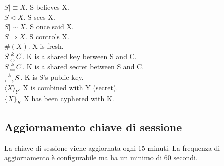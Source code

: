 \documentclass[a4paper,titlepage]{article}
\begin{document}
$ S \mid \equiv X  $. S believes X.\\
$ S \lhd X  $. S sees X.\\
$ S \mid \sim X  $. S once said X.\\
$ S \Rightarrow X $. S controls X.\\ 
$ \#(X) $. X is fresh.\\
$S {k \atop \leftrightarrow} C $. K is a shared key between S and C.\\ 
$S {k \atop \leftrightharpoons} C $. K is a shared secret between S and C.\\ 
${k  \atop \longmapsto} S $. K is S's public key.\\
$\langle X \rangle_{Y}$. X is combined with Y (secret).\\
$\{X\}_{K}$ X has been cyphered with K.

\subsection{Aggiornamento chiave di sessione}
La chiave di sessione viene aggiornata ogni 15 minuti. La frequenza di aggiornamento è configurabile ma ha un minimo di 60 secondi. 
\end{document}
